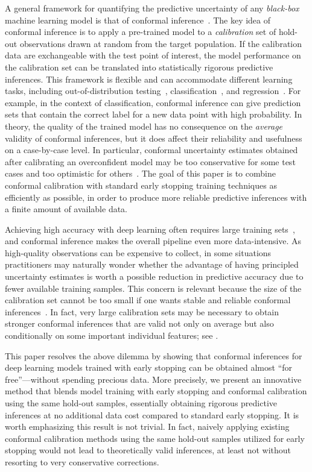 A general framework for quantifying the predictive uncertainty of any {\em black-box} machine learning model is that of conformal inference~\cite{vovk2005algorithmic}.
The key idea of conformal inference is to apply a pre-trained model to a {\em calibration} set of hold-out observations drawn at random from the target population.
If the calibration data are exchangeable with the test point of interest, the model performance on the calibration set can be translated into statistically rigorous predictive inferences.
This framework is flexible and can accommodate different learning tasks, including out-of-distribution testing~\cite{smith2015conformal}, classification~\cite{vovk2003mondrian}, and regression~\cite{vovk2005algorithmic}.
For example, in the context of classification, conformal inference can give prediction sets that contain the correct label for a new data point with high probability.
In theory, the quality of the trained model has no consequence on the {\em average} validity of conformal inferences, but it does affect their reliability and usefulness on a case-by-case level.
In particular, conformal uncertainty estimates obtained after calibrating an overconfident model may be too conservative for some test cases and too optimistic for others~\cite{romano2020classification}.
The goal of this paper is to combine conformal calibration with standard early stopping training techniques as efficiently as possible, in order to produce more reliable predictive inferences with a finite amount of available data.

Achieving high accuracy with deep learning often requires large training sets~\cite{marcus2018deep}, and conformal inference makes the overall pipeline even more data-intensive.
As high-quality observations can be expensive to collect, in some situations practitioners may naturally wonder whether the advantage of having principled uncertainty estimates is worth a possible reduction in predictive accuracy due to fewer available training samples.
This concern is relevant because the size of the calibration set cannot be too small if one wants stable and reliable conformal inferences~\cite{vovk2012conditional,sesia2020comparison}.
In fact, very large calibration sets may be necessary to obtain stronger conformal inferences that are valid not only on average but also conditionally on some important individual features; see \citet{vovk2003mondrian,romano2019malice,barber2019limits}.

This paper resolves the above dilemma by showing that conformal inferences for deep learning models trained with early stopping can be obtained almost ``for free''---without spending precious data.
More precisely, we present an innovative method that blends model training with early stopping and conformal calibration using the same hold-out samples, essentially obtaining rigorous predictive inferences at no additional data cost compared to standard early stopping.
It is worth emphasizing this result is not trivial.
In fact, naively applying existing conformal calibration methods using the same hold-out samples utilized for early stopping would not lead to theoretically valid inferences, at least not without resorting to very conservative corrections.

